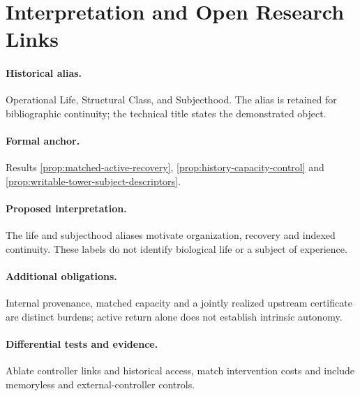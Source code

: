 \documentclass[11pt,a4paper]{article}
\theoremstyle{definition}
\begin{document}
\section{Interpretation and Open Research Links}\label{sec:interpretation-open-links}
\paragraph{Historical alias.} Operational Life, Structural Class, and Subjecthood. The alias is retained for bibliographic continuity; the technical title states the demonstrated object.

\paragraph{Formal anchor.} Results \ref{prop:matched-active-recovery}, \ref{prop:history-capacity-control} and \ref{prop:writable-tower-subject-descriptors}.

\paragraph{Proposed interpretation.} The life and subjecthood aliases motivate organization, recovery and indexed continuity. These labels do not identify biological life or a subject of experience.

\paragraph{Additional obligations.} Internal provenance, matched capacity and a jointly realized upstream certificate are distinct burdens; active return alone does not establish intrinsic autonomy.

\paragraph{Differential tests and evidence.} Ablate controller links and historical access, match intervention costs and include memoryless and external-controller controls.



\printbibliography

\end{document}
